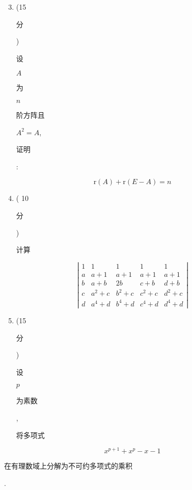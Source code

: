 \documentclass[10pt]{article}
\begin{document}
\begin{enumerate}
  \setcounter{enumi}{2}
  \item (15 \begin{CJK}{UTF8}{mj}分\end{CJK}) \begin{CJK}{UTF8}{mj}设\end{CJK} $A$ \begin{CJK}{UTF8}{mj}为\end{CJK} $n$ \begin{CJK}{UTF8}{mj}阶方阵且\end{CJK} $A^{2}=A$, \begin{CJK}{UTF8}{mj}证明\end{CJK}:
\end{enumerate}
$$
\mathrm{r}(A)+\mathrm{r}(E-A)=n
$$

\begin{enumerate}
  \setcounter{enumi}{3}
  \item ( 10 \begin{CJK}{UTF8}{mj}分\end{CJK}) \begin{CJK}{UTF8}{mj}计算\end{CJK}
\end{enumerate}
$$
\left|\begin{array}{ccccc}
1 & 1 & 1 & 1 & 1 \\
a & a+1 & a+1 & a+1 & a+1 \\
b & a+b & 2 b & c+b & d+b \\
c & a^{2}+c & b^{2}+c & c^{2}+c & d^{2}+c \\
d & a^{4}+d & b^{4}+d & c^{4}+d & d^{4}+d
\end{array}\right|
$$

\begin{enumerate}
  \setcounter{enumi}{4}
  \item (15 \begin{CJK}{UTF8}{mj}分\end{CJK}) \begin{CJK}{UTF8}{mj}设\end{CJK} $p$ \begin{CJK}{UTF8}{mj}为素数\end{CJK}, \begin{CJK}{UTF8}{mj}将多项式\end{CJK}
\end{enumerate}
$$
x^{p+1}+x^{p}-x-1
$$
\begin{CJK}{UTF8}{mj}在有理数域上分解为不可约多项式的乘积\end{CJK}.
\end{document}
